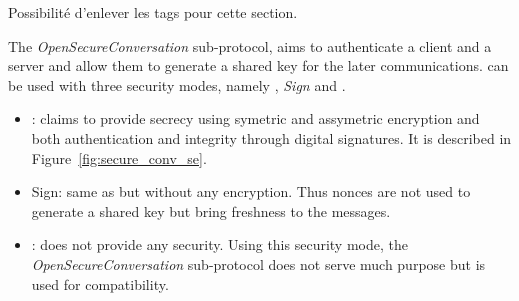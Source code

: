 \newcommand{\gereq}{GEReq}
\newcommand{\geres}{GERes}
\newcommand{\oscreq}{OSCReq}
\newcommand{\oscres}{OSCRes}

\TODO Possibilité d'enlever les tags pour cette section.

The {\em OpenSecureConversation} sub-protocol, aims to authenticate a client and
a server and allow them to generate a shared key for the later communications.
\opcua can be used with three security modes, namely {\em \smn}, {\em Sign} and
{\em \smse}.

\begin{itemize}
    \item \smse: claims to provide secrecy using symetric and
      assymetric encryption and both authentication and integrity
      through digital signatures.  It is described in
      Figure~\ref{fig:secure_conv_se}.

    \item Sign: same as {\em \smse} but without any encryption.  Thus
      nonces are not used to generate a shared key but bring freshness
      to the messages.

    \item \smn: does not provide any security.  Using this security
      mode, the {\em OpenSecureConversation} sub-protocol does not
      serve much purpose but is used for compatibility.
\end{itemize}

